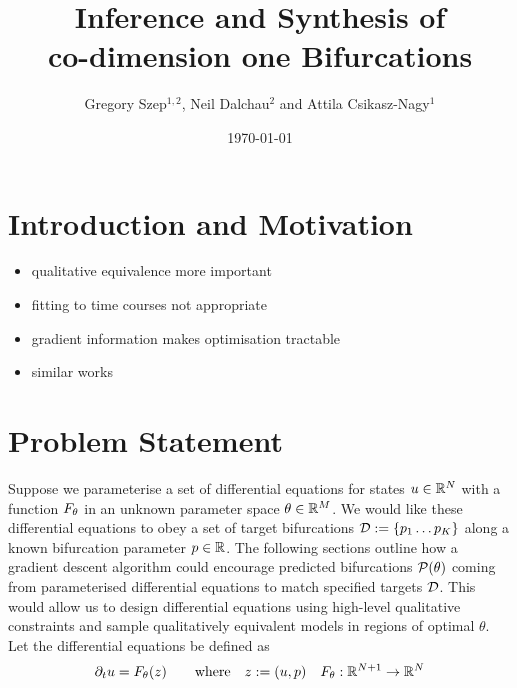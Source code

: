 



\title{Inference and Synthesis of\\ co-dimension one Bifurcations}
\author{Gregory Szep$^{1,2}$, Neil Dalchau$^2$ and Attila Csikasz-Nagy$^1$}
\date{\today} \maketitle

\section{Introduction and Motivation}
\begin{itemize}
\item qualitative equivalence more important
\item fitting to time courses not appropriate
\item gradient information makes optimisation tractable
\item similar works
\end{itemize}
\clearpage

\section{Problem Statement}
Suppose we parameterise a set of differential equations for states $u\in\mathbb{R}^N$ with a function $F_{\theta}$ in an unknown parameter space $\theta\in\mathbb{R}^M$. We would like these differential equations to obey a set of target bifurcations $\mathcal{D}:=\{p_1\dots p_K\}$ along a known bifurcation parameter $p\in\mathbb{R}$. The following sections outline how a gradient descent algorithm could encourage predicted bifurcations $\mathcal{P}(\theta)$ coming from parameterised differential equations to match specified targets $\mathcal{D}$. This would allow us to design differential equations using high-level qualitative constraints and sample qualitatively equivalent models in regions of optimal $\theta$. Let the differential equations be defined as
\begin{align}
	\partial_t u=F_{\theta}(z)
	\qquad\mathrm{where}\quad z:=(u,p)\quad
	F_{\theta} : \mathbb{R}^{N+1}\rightarrow\mathbb{R}^N
	\label{eq:model}
\end{align}
